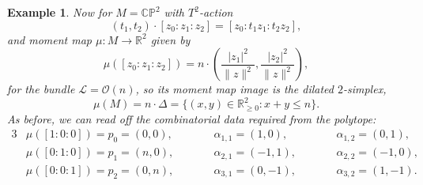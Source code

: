 \documentclass{article}
\newtheorem{example}{Example}
\newcommand{\st}{\ensuremath{:}}%
\newcommand{\ra}{\rightarrow}
\newcommand{\PP}{\mathbb{P}}
\newcommand{\RR}{\mathbb{R}}
\newcommand{\CC}{\mathbb{C}}
\newcommand{\mcL}{\mathcal{L}}
\newcommand{\mcO}{\mathcal{O}}
\begin{document}
\begin{example}
	Now for $M =\CC\PP^{2}$ with $T^{2}$-action
	\begin{equation*}
		(t_{1},t_{2}) \cdot [z_{0} : z_{1} : z_{2}] = [z_{0} : t_{1}z_{1} : t_{2}z_{2}],
	\end{equation*}
	and moment map $\mu : M \ra \RR^{2}$ given by
	\begin{equation*}
		\mu([z_{0}: z_{1} : z_{2}]) = n\cdot \left( \frac{|z_{1}|^{2}}{\|z\|^{2}}, \frac{|z_{2}|^{2}}{\|z\|^{2}} \right),
	\end{equation*}
	for the bundle $\mcL = \mcO(n)$, so its moment map image is the dilated $2$-simplex,
	\begin{equation*}
		\mu(M) = n\cdot \Delta = \{ (x,y) \in \RR^{2}_{\geq 0} \st x + y \leq n \}.
	\end{equation*}
	As before, we can read off the combinatorial data required from the polytope:
	\begin{alignat*}{3}
		&\mu([1:0:0]) = p_{0} = (0,0), \qquad && \alpha_{1,1} = (1,0), \qquad	&& \alpha_{1,2} = (0,1), \\
		&\mu([0:1:0]) = p_{1} = (n,0), \qquad&& \alpha_{2,1} = (-1,1), \qquad && \alpha_{2,2} = (-1,0), \\
		&\mu([0:0:1]) = p_{2} = (0,n), \qquad && \alpha_{3,1} = (0,-1), \qquad && \alpha_{3,2} = (1,-1).
	\end{alignat*}
	

\end{example}
\end{document}
